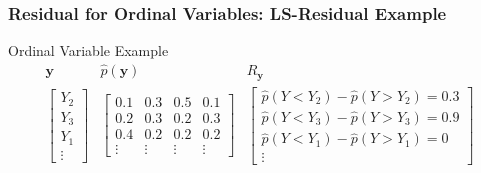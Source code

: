 \documentclass{beamer}
\begin{document}
\begin{frame}
	\frametitle{Residual for Ordinal Variables: LS-Residual Example}
	\begin{block}{Ordinal Variable Example}
	\[
		\begin{array}{ccc}
			\bm{y} & \hat{p}(\bm{y}) & R_{\bm{y}} \\

			\begin{bmatrix}
				Y_2 \\
				Y_3 \\
				Y_1 \\
				\vdots
			\end{bmatrix} &
			\begin{bmatrix}
				0.1 & 0.3 & 0.5 & 0.1 \\
				0.2 & 0.3 & 0.2 & 0.3 \\
				0.4 & 0.2 & 0.2 & 0.2 \\
				\vdots & \vdots & \vdots & \vdots
			\end{bmatrix} &
			\begin{bmatrix}
				\hat{p}(Y < Y_2) - \hat{p}(Y>Y_2) = 0.3 \\
				\hat{p}(Y < Y_3) - \hat{p}(Y>Y_3) = 0.9 \\
				\hat{p}(Y < Y_1) - \hat{p}(Y>Y_1) = 0 \\
				\vdots
			\end{bmatrix} \\
		\end{array}
	\]
	\end{block}


\end{frame}
\end{document}

